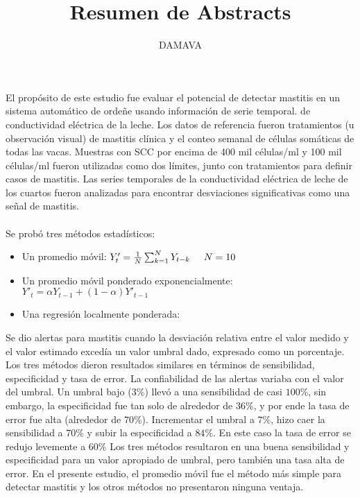 \documentclass[a4paper, 11pt]{article}
\title{\huge Resumen de Abstracts\\}
\author{\textsc{DAMAVA}}
\begin{document}
	
	\maketitle

\section{\cite{2005}}
El propósito de este estudio fue evaluar el potencial de detectar mastitis en un sistema automático de ordeñe usando información de serie temporal.
de conductividad eléctrica de la leche.  
Los datos de referencia fueron tratamientos (u observación visual) de mastitis clínica y el conteo semanal de células somáticas de todas las vacas. Muestras con SCC por encima de 400 mil células/ml  y 100 mil células/ml fueron utilizadas como dos límites, junto con tratamientos para definir casos de mastitis. Las series temporales de la conductividad eléctrica de leche de los cuartos fueron analizadas para encontrar desviaciones significativas como una señal de mastitis.\\\\
Se probó tres métodos estadísticos:
\begin{itemize}
	\item Un promedio móvil: $Y'_{t}= \frac{1}{N}\sum_{k=1}^{N}Y_{t-k} \hspace{0.5cm} N= 10$
	\item Un promedio móvil ponderado exponencialmente:\\ $Y'_{t}=\alpha Y_{t-1}+(1-\alpha)Y'_{t-1}$
	\item Una regresión localmente ponderada:
\end{itemize}
Se dio alertas para mastitis cuando la desviación relativa entre el valor medido y el valor estimado excedía un valor umbral dado, expresado como un porcentaje. Los tres métodos dieron resultados similares en términos de sensibilidad, especificidad y tasa de error. La confiabilidad de las alertas variaba con el valor del umbral. Un umbral bajo ($3\%$) llevó a una sensibilidad de casi $100\%$, sin embargo, la especificidad fue tan solo de alrededor de $36\%$, y por ende la tasa de error fue alta (alrededor de $70\%$). Incrementar el umbral a $7\%$, hizo caer la sensibilidad a $70\%$ y subir la especificidad a $84\%$. En este caso la tasa de error se redujo levemente a $60\%$ Los tres métodos resultaron en una buena sensibilidad y especificidad para un valor apropiado de umbral, pero también una tasa alta de error. En el presente estudio, el promedio móvil fue el método más simple para detectar mastitis y los otros métodos no presentaron ninguna ventaja.
\end{document}
